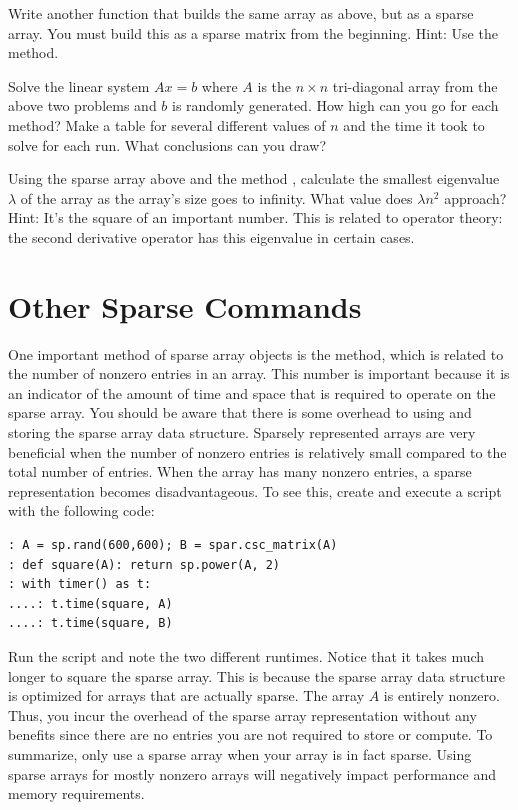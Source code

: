 \begin{problem}
Write another function that builds the same array as above, but as a sparse array. You must build this as a sparse matrix from the beginning. Hint: Use the  method.
\end{problem}

\begin{problem}
Solve the linear system $Ax = b$ where $A$ is the $n\times n$
tri-diagonal array from the above two problems and $b$ is randomly
generated.  How high can you go for each method?  Make a table for
several different values of $n$ and the time it took to solve for
each run.  What conclusions can you draw?
\end{problem}

\begin{problem}
Using the sparse array above and the method , calculate the smallest eigenvalue $\lambda$ of the array as the array's size goes to infinity. What value does $\lambda n^2$ approach?  Hint: It's the square of an important number. This is related to operator theory: the second derivative operator has this eigenvalue in certain cases.
\end{problem}

\section*{Other Sparse Commands}

One important method of sparse array objects is the  method, which is related to the number of nonzero entries in an array.  This number is important because it is an indicator of the amount of time and space that is required to operate on the sparse array. You should be aware that there is some overhead to using and storing the sparse array data structure. Sparsely represented arrays are very beneficial when the number of nonzero entries is relatively small compared to the total number of entries. When the array has many nonzero entries, a sparse representation becomes disadvantageous. To see this, create and execute a script with the following code:
\begin{lstlisting}
: A = sp.rand(600,600); B = spar.csc_matrix(A)
: def square(A): return sp.power(A, 2)
: with timer() as t:
....: t.time(square, A)
....: t.time(square, B)
\end{lstlisting}

Run the script and note the two different runtimes. Notice that it takes much longer to square the sparse array. This is because the sparse array data structure is optimized for arrays that are actually sparse. The array $A$ is entirely nonzero. Thus, you incur the overhead of the sparse array representation without any benefits since there are no entries you are not required to store or compute. To summarize, only use a sparse array when your array is in fact sparse. Using sparse arrays for mostly nonzero arrays will negatively impact performance and memory requirements.


